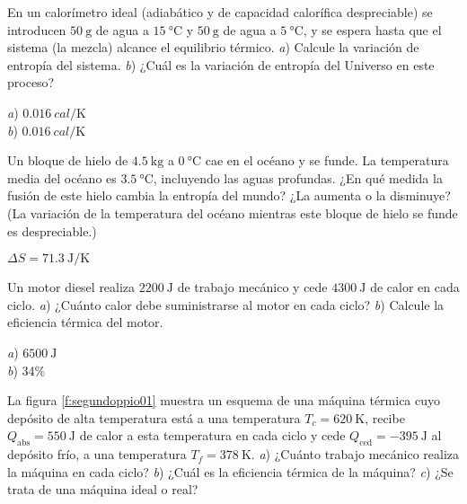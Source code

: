 \setcounter{figure}{0}
%
\begin{Exercise}
  En un calorímetro ideal (adiabático y de capacidad calorífica despreciable) se introducen $\SI{50}{\gram}$ de agua a $\SI{15}{\celsius}$ y $\SI{50}{\gram}$ de agua a $\SI{5}{\celsius}$, y se espera hasta que el sistema (la mezcla) alcance el equilibrio térmico. \textit{a}) Calcule la variación de entropía del sistema. \textit{b}) ¿Cuál es la variación de entropía del Universo en este proceso?
\end{Exercise}
\begin{Answer}
	\begin{minipage}[t]{.4\textwidth}
    \textit{a}) $\SI{0.016}{cal/\kelvin}$\\ \textit{b}) $\SI{0.016}{cal/\kelvin}$
  \end{minipage}
\end{Answer}
%
\begin{Exercise}
  Un bloque de hielo de $\SI{4.5}{\kilogram}$ a $\SI{0}{\celsius}$ cae en el océano y se funde. La temperatura media del océano es $\SI{3.5}{\celsius}$, incluyendo las aguas profundas. ¿En qué medida la fusión de este hielo cambia la entropía del mundo? ¿La aumenta o la disminuye? (La variación de la temperatura del océano mientras este bloque de hielo se funde es despreciable.)
\end{Exercise}
\begin{Answer}
	\begin{minipage}[t]{.4\textwidth}
    $\Delta S = \SI{71.3}{\joule/\kelvin}$
  \end{minipage}
\end{Answer}
%
\begin{Exercise}
  Un motor diesel realiza $\SI{2200}{\joule}$ de trabajo mecánico y cede $\SI{4300}{\joule}$ de calor en cada ciclo. \textit{a}) ¿Cuánto calor debe suministrarse al motor en cada ciclo? \textit{b}) Calcule la eficiencia térmica del motor.
\end{Exercise}
\begin{Answer}
	\begin{minipage}[t]{.4\textwidth}
    \textit{a}) $\SI{6500}{\joule}$\\ \textit{b}) 34\%
  \end{minipage}
\end{Answer}
%
\begin{Exercise}\label{p:segundoppio01}
  {}{}
  La figura \ref{f:segundoppio01} muestra un esquema de una máquina térmica cuyo depósito de alta temperatura está a una temperatura $T_c = \SI{620}{\kelvin}$, recibe $Q_\text{abs} = \SI{550}{\joule}$ de calor a esta temperatura en cada ciclo y cede $Q_\text{ced} = \SI{-395}{\joule}$ al depósito frío, a una temperatura $T_f = \SI{378}{\kelvin}$. \textit{a}) ¿Cuánto trabajo mecánico realiza la máquina en cada ciclo? \textit{b}) ¿Cuál es la eficiencia térmica de la máquina? \textit{c}) ¿Se trata de una máquina ideal o real?
\end{Exercise}
